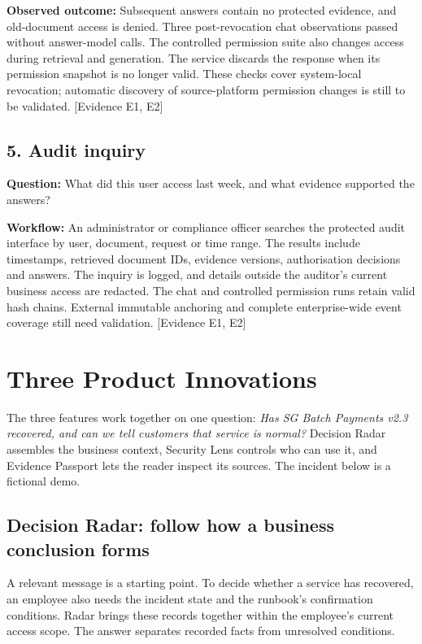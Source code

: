 \documentclass[10pt,a4paper]{article}
\newcommand{\evidence}[1]{{\footnotesize\textcolor{Muted}{[Evidence #1]}}}
\begin{document}
\textbf{Observed outcome:} Subsequent answers contain no protected evidence, and old-document access is denied. Three post-revocation chat observations passed without answer-model calls. The controlled permission suite also changes access during retrieval and generation. The service discards the response when its permission snapshot is no longer valid. These checks cover system-local revocation; automatic discovery of source-platform permission changes is still to be validated. \evidence{E1, E2}

\subsection{5. Audit inquiry}
\textbf{Question:} What did this user access last week, and what evidence supported the answers?

\textbf{Workflow:} An administrator or compliance officer searches the protected audit interface by user, document, request or time range. The results include timestamps, retrieved document IDs, evidence versions, authorisation decisions and answers. The inquiry is logged, and details outside the auditor's current business access are redacted. The chat and controlled permission runs retain valid hash chains. External immutable anchoring and complete enterprise-wide event coverage still need validation. \evidence{E1, E2}

\clearpage
\section{Three Product Innovations}
The three features work together on one question: \emph{Has SG Batch Payments v2.3 recovered, and can we tell customers that service is normal?} Decision Radar assembles the business context, Security Lens controls who can use it, and Evidence Passport lets the reader inspect its sources. The incident below is a fictional demo.

\subsection{Decision Radar: follow how a business conclusion forms}
A relevant message is a starting point. To decide whether a service has recovered, an employee also needs the incident state and the runbook's confirmation conditions. Radar brings these records together within the employee's current access scope. The answer separates recorded facts from unresolved conditions.
\end{document}
